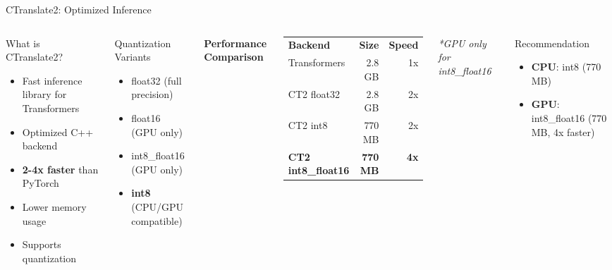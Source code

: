\begin{frame}{CTranslate2: Optimized Inference}
\begin{columns}
\begin{block}{What is CTranslate2?}
\begin{itemize}
  \item Fast inference library for Transformers
  \item Optimized C++ backend
  \item \textbf{2-4x faster} than PyTorch
  \item Lower memory usage
  \item Supports quantization
\end{itemize}
\end{block}

\begin{block}{Quantization Variants}
\begin{itemize}
  \item float32 (full precision)
  \item float16 (GPU only)
  \item int8\_float16 (GPU only)
  \item \textbf{int8} (CPU/GPU compatible)
\end{itemize}
\end{block}
\textbf{Performance Comparison}

\begin{center}
\begin{tabular}{l|r|r}
\textbf{Backend} & \textbf{Size} & \textbf{Speed} \\
Transformers & 2.8 GB & 1x \\
CT2 float32 & 2.8 GB & 2x \\
CT2 int8 & 770 MB & 2x \\
\textbf{CT2 int8\_float16} & \textbf{770 MB} & \textbf{4x} \\
\end{tabular}
\end{center}

\textit{*GPU only for int8\_float16}

\begin{block}{Recommendation}
\begin{itemize}
  \item \textbf{CPU}: int8 (770 MB)
  \item \textbf{GPU}: int8\_float16 (770 MB, 4x faster)
\end{itemize}
\end{block}
\end{columns}
\end{frame}

